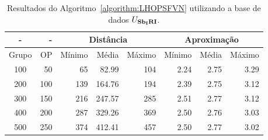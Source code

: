 \begin{table}[!htb]
  \caption{Resultados do Algoritmo~\ref{algorithm:LHOPSFVN} utilizando a base de dados $U_{\textbf{Sb\textsubscript{I}RI}}{}$.}
  \label{table:UIARBECI}
  \centering
  \begin{tabular}{|c|r|r|r|r|r|r|r|}
    \hline
      -      &  -   & \multicolumn{3}{c|}{Distância}             & \multicolumn{3}{c|}{Aproximação}           \\ \hline
    Grupo    & OP   & Mínimo       & Média        & Máximo       & Mínimo       & Média        & Máximo       \\ \hline  
    100      & 50   & 65           & 82.99        & 104          & 2.24         & 2.75         & 3.29         \\ \hline
    200      & 100  & 139          & 164.76       & 194          & 2.39         & 2.75         & 3.12         \\ \hline
    300      & 150  & 216          & 247.57       & 285          & 2.51         & 2.77         & 3.12         \\ \hline
    400      & 200  & 287          & 329.26       & 369          & 2.50         & 2.76         & 3.03         \\ \hline
    500      & 250  & 374          & 412.41       & 457          & 2.50         & 2.77         & 3.02         \\ \hline    
  \end{tabular}
\end{table}